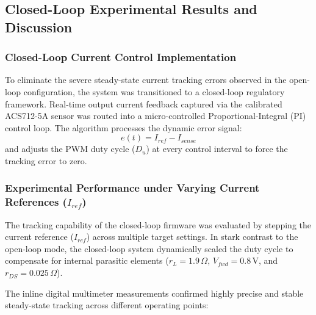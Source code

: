 \subsection{Closed-Loop Experimental Results and Discussion}

\subsubsection{Closed-Loop Current Control Implementation}
To eliminate the severe steady-state current tracking errors observed in the open-loop configuration, the system was transitioned to a closed-loop regulatory framework. Real-time output current feedback captured via the calibrated ACS712-5A sensor was routed into a micro-controlled Proportional-Integral (PI) control loop. The algorithm processes the dynamic error signal:
\begin{equation}
e(t) = I_{ref} - I_{sense}
\end{equation}
and adjusts the PWM duty cycle ($D_u$) at every control interval to force the tracking error to zero. 

\subsubsection{Experimental Performance under Varying Current References ($I_{ref}$)}
The tracking capability of the closed-loop firmware was evaluated by stepping the current reference ($I_{ref}$) across multiple target settings. In stark contrast to the open-loop mode, the closed-loop system dynamically scaled the duty cycle to compensate for internal parasitic elements ($r_L = 1.9\,\Omega$, $V_{fwd} = 0.8\,\text{V}$, and $r_{DS} = 0.025\,\Omega$).

The inline digital multimeter measurements confirmed highly precise and stable steady-state tracking across different operating points:

